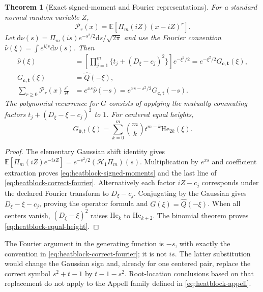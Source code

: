 \documentclass[11pt]{article}
\newtheorem{theorem}{Theorem}[section]
\theoremstyle{definition}
\theoremstyle{remark}
\newcommand{\E}{\mathbb E}
\newcommand{\dd}{\mathrm d}
\begin{document}
\begin{theorem}[Exact signed-moment and Fourier representations]
\label{thm:heatblock-signed-symbol}
For a standard normal random variable $Z$,
\begin{equation}
 \mathcal P_r(x)=\E[\Pi_m(iZ)(x-iZ)^r].
 \label{eq:heatblock-signed-moments}
\end{equation}
Let $\dd\nu(s)=\Pi_m(is)e^{-s^2/2}\dd s/\sqrt{2\pi}$ and use the
Fourier convention
$\widehat\nu(\xi)=\int e^{i\xi s}\dd\nu(s)$.
Then
\begin{equation}
 \begin{split}
 \widehat\nu(\xi)
 &=\left[\prod_{j=1}^m\{t_j+(D_\xi-c_j)^2\}\right]e^{-\xi^2/2}
   =e^{-\xi^2/2}G_{\boldsymbol c,\boldsymbol t}(\xi),\\
 G_{\boldsymbol c,\boldsymbol t}(\xi)&=\widehat Q(-\xi),\\
 \sum_{r\ge0}\mathcal P_r(x)\frac{s^r}{r!}
 &=e^{xs}\widehat\nu(-s)
   =e^{xs-s^2/2}G_{\boldsymbol c,\boldsymbol t}(-s).
 \end{split}
 \label{eq:heatblock-correct-fourier}
\end{equation}
The polynomial recurrence for $G$ consists of applying the mutually
commuting factors $t_j+(D_\xi-\xi-c_j)^2$ to $1$.
For centered equal heights,
\begin{equation}
 G_{\boldsymbol0,t}(\xi)
 =\sum_{k=0}^m\binom mk t^{m-k}\mathrm{He}_{2k}(\xi).
 \label{eq:heatblock-equal-height}
\end{equation}
\end{theorem}

\begin{proof}
The elementary Gaussian shift identity gives
$\E[\Pi_m(iZ)e^{-isZ}]=e^{-s^2/2}(\mathcal H_1\Pi_m)(s)$.
Multiplication by $e^{xs}$ and coefficient extraction proves
\eqref{eq:heatblock-signed-moments} and the last line of
\eqref{eq:heatblock-correct-fourier}.
Alternatively each factor $iZ-c_j$ corresponds under the declared
Fourier transform to $D_\xi-c_j$.  Conjugating by the Gaussian gives
$D_\xi-\xi-c_j$, proving the operator formula and
$G(\xi)=\widehat Q(-\xi)$.
When all centers vanish, $(D_\xi-\xi)^2$ raises
$\mathrm{He}_k$ to $\mathrm{He}_{k+2}$.  The binomial theorem proves
\eqref{eq:heatblock-equal-height}.
\end{proof}

The Fourier argument in the generating function is $-s$, with exactly
the convention in \eqref{eq:heatblock-correct-fourier}; it is not $is$.
The latter substitution would change the Gaussian sign and, already
for one centered pair, replace the correct symbol $s^2+t-1$ by
$t-1-s^2$.  Root-location conclusions based on that replacement do not
apply to the Appell family defined in \eqref{eq:heatblock-appell}.
\end{document}

